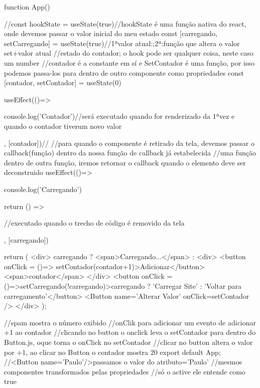 function App() {
 
  //const hookState = useState(true)//hookState é uma função nativa do react, onde devemos passar o valor inicial do meu estado
  const [carregando, setCarregando] = useState(true)//1ªvalor atual:;2ª:função que altera o valor set+valor atual
  //estado do contador; o hook pode ser qualquer coisa, neste caso um number
  //contador é a constante em sí e SetContador é uma função, por isso podemos passa-los para dentro de outro componente como propriedades
  const [contador, setContador] = useState(0)

  useEffect(()=>{
    console.log('Contador')//será executado quando for renderizado da 1ªvez e quando o contador tiverum novo valor

  }, [contador])//
//para quando o componente é retirado da tela, devemos passar o callback(função) dentro da nossa função de callback já estabelecida
//uma função dentro de outra função, iremos retornar o callback quando o elemento deve ser deconstruido  
  useEffect(()=>{ 
    console.log('Carregando')

    return () =>{//executado quando o trecho de código é removido da tela
      

    }

  }, [carregando])

  return (
   <div>
    {carregando ? 
    <span>Carregando...</span> 
    :
    <div>
      <button onClick = {()=> setContador(contador+1)}>Adicionar</button>
      <span>{contador}</span>
    </div>
    }
    <button onClick = {()=>setCarregando(!carregando)}>{carregando ? 'Carregar Site' : 'Voltar para carregamento'}</button>
    <Button name='Alterar Valor' onClick={setContador} />
    </div>
  );
}
//spam mostra o número exibido
//onClik para adicionar um evento de adicionar +1 ao contador
//clicando no button o onclick leva o setContador para dentro do Button.js, oque torna o onClick no setContador
//clicar no button altera o valor por +1, ao clicar no Button o contador mostra 20 
export default App;
//<Button name='Paulo'/>passamos o valor do atributo='Paulo'
//mesmos componentes transformados pelas propriedades
//só o active ele entende como true